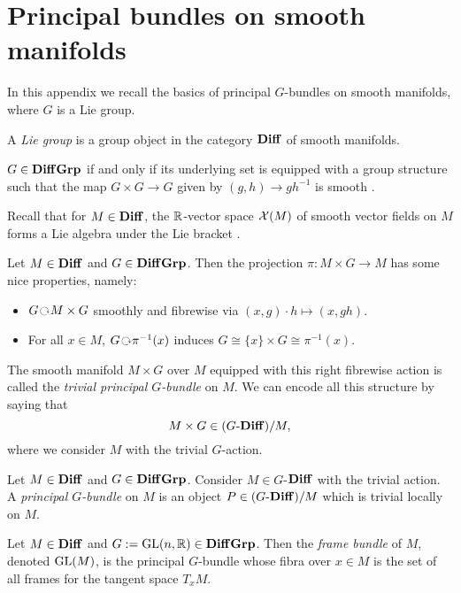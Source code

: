 \section{Principal bundles on smooth manifolds}

In this appendix we recall the basics of principal $G$-bundles on smooth manifolds, where $G$ is a Lie group.

\begin{defn}
    A \textit{Lie group} is a group object in the category $\mathbf{Diff}$ of smooth manifolds.
\end{defn}

\begin{rem}
    $G\in \mathbf{Diff}\mathbf{Grp}$ if and only if its underlying set is equipped with a group structure such that the map $G\times G\to G$ given by $(g,h)\to gh^{-1}$ is smooth \cite[Proposition 7.1]{lee13}.
\end{rem}

Recall that for $M\in \mathbf{Diff}$, the $\mathbb{R}$-vector space $\mathcal{X}(M)$ of smooth vector fields on $M$ forms a Lie algebra under the Lie bracket \cite[Proposition 8.28]{lee13}.

Let $M\in \mathbf{Diff}$ and $G\in \mathbf{Diff}\mathbf{Grp}$.
Then the projection $\pi\colon M\times G\to M$ has some nice properties, namely:
\begin{itemize}
    \item $G\act M\times G$ smoothly and fibrewise via $(x,g)\cdot h\mapsto (x,gh)$.
    \item For all $x\in M$, $G\act \pi^{-1}(x)$ induces $G\cong \{x\}\times G\cong \pi^{-1}(x)$.
\end{itemize}
The smooth manifold $M\times G$ over $M$ equipped with this right fibrewise action is called the \textit{trivial principal $G$-bundle} on $M$.
We can encode all this structure by saying that
\[ M\times G \in (G\text{-}\mathbf{Diff})/M, \]
where we consider $M$ with the trivial $G$-action.

\begin{defn}
    Let $M\in \mathbf{Diff}$ and $G\in \mathbf{Diff}\mathbf{Grp}$.
    Consider $M\in G$-$\mathbf{Diff}$ with the trivial action.
    A \textit{principal $G$-bundle} on $M$ is an object $P\in (G\text{-}\mathbf{Diff})/M$ which is trivial locally on $M$.
\end{defn}

\begin{exa}
    Let $M\in \mathbf{Diff}$ and $G:=\operatorname{GL}(n,\mathbb{R})\in \mathbf{Diff}\mathbf{Grp}$.
    Then the \textit{frame bundle} of $M$, denoted $\operatorname{GL}(M)$, is the principal $G$-bundle whose fibra over $x\in M$ is the set of all frames for the tangent space $T_{x}M$.
\end{exa}

